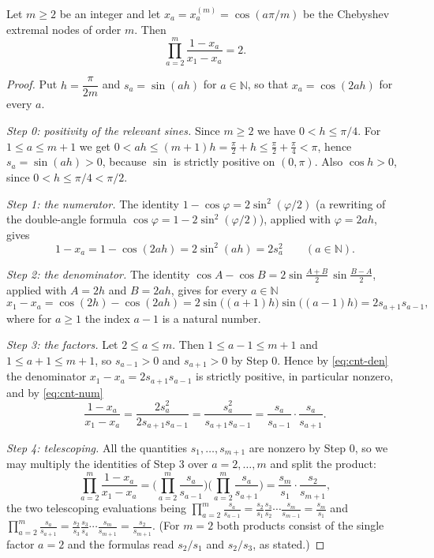 \begin{lemma}
Let $m\ge2$ be an integer and let $x_a=x^{(m)}_a=\cos(a\pi/m)$ be the Chebyshev
extremal nodes of order $m$. Then
\[
  \prod_{a=2}^{m}\frac{1-x_a}{x_1-x_a}=2 .
\]
\end{lemma}
\begin{proof}
Put $h=\dfrac{\pi}{2m}$ and $s_a=\sin(ah)$ for $a\in\mathbb{N}$, so that
$x_a=\cos(2ah)$ for every $a$.

\emph{Step 0: positivity of the relevant sines.} Since $m\ge2$ we have
$0<h\le\pi/4$. For $1\le a\le m+1$ we get
$0<ah\le(m+1)h=\frac{\pi}{2}+h\le\frac{\pi}{2}+\frac{\pi}{4}<\pi$, hence
$s_a=\sin(ah)>0$, because $\sin$ is strictly positive on $(0,\pi)$. Also
$\cos h>0$, since $0<h\le\pi/4<\pi/2$.

\emph{Step 1: the numerator.} The identity $1-\cos\varphi=2\sin^2(\varphi/2)$
(a rewriting of the double-angle formula
$\cos\varphi=1-2\sin^2(\varphi/2)$), applied with $\varphi=2ah$, gives
\begin{equation}\label{eq:cnt-num}
  1-x_a=1-\cos(2ah)=2\sin^2(ah)=2s_a^2
  \qquad(a\in\mathbb{N}).
\end{equation}

\emph{Step 2: the denominator.} The identity
$\cos A-\cos B=2\sin\!\frac{A+B}{2}\,\sin\!\frac{B-A}{2}$, applied with
$A=2h$ and $B=2ah$, gives for every $a\in\mathbb{N}$
\begin{equation}\label{eq:cnt-den}
  x_1-x_a=\cos(2h)-\cos(2ah)
   =2\sin\bigl((a+1)h\bigr)\sin\bigl((a-1)h\bigr)=2s_{a+1}s_{a-1},
\end{equation}
where for $a\ge1$ the index $a-1$ is a natural number.

\emph{Step 3: the factors.} Let $2\le a\le m$. Then $1\le a-1\le m+1$ and
$1\le a+1\le m+1$, so $s_{a-1}>0$ and $s_{a+1}>0$ by Step 0. Hence by
\eqref{eq:cnt-den} the denominator $x_1-x_a=2s_{a+1}s_{a-1}$ is strictly
positive, in particular nonzero, and by \eqref{eq:cnt-num}
\[
  \frac{1-x_a}{x_1-x_a}=\frac{2s_a^2}{2s_{a+1}s_{a-1}}
   =\frac{s_a^2}{s_{a+1}s_{a-1}}
   =\frac{s_a}{s_{a-1}}\cdot\frac{s_a}{s_{a+1}} .
\]

\emph{Step 4: telescoping.} All the quantities $s_1,\dots,s_{m+1}$ are nonzero
by Step 0, so we may multiply the identities of Step 3 over $a=2,\dots,m$ and
split the product:
\[
  \prod_{a=2}^{m}\frac{1-x_a}{x_1-x_a}
  =\Biggl(\prod_{a=2}^{m}\frac{s_a}{s_{a-1}}\Biggr)
   \Biggl(\prod_{a=2}^{m}\frac{s_a}{s_{a+1}}\Biggr)
  =\frac{s_m}{s_1}\cdot\frac{s_2}{s_{m+1}} ,
\]
the two telescoping evaluations being
$\prod_{a=2}^{m}\frac{s_a}{s_{a-1}}
=\frac{s_2}{s_1}\frac{s_3}{s_2}\cdots\frac{s_m}{s_{m-1}}=\frac{s_m}{s_1}$ and
$\prod_{a=2}^{m}\frac{s_a}{s_{a+1}}
=\frac{s_2}{s_3}\frac{s_3}{s_4}\cdots\frac{s_m}{s_{m+1}}=\frac{s_2}{s_{m+1}}$.
(For $m=2$ both products consist of the single factor $a=2$ and the formulas
read $s_2/s_1$ and $s_2/s_3$, as stated.)


\end{proof}
